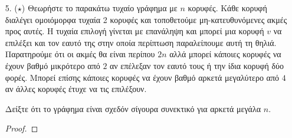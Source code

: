 \documentclass[a4paper, oneside, 11pt]{article}
\theoremstyle{definition}
\begin{document}
\begin{enumerate}
Λήμμα 2: Το ${x \choose 2} + {y\choose 2} + {n-x-y \choose 2}$ ελαχιστοποιείται για $x=y=\frac{n}{3}$.
\begin{proof}
Η παραπάνω παράσταση είναι ίση με $\frac{1}{2} (x^2 + y^2 + (n-x-y)^2 - (x+y+n-x-y)) \geq_{cauchy-schwarz} \frac{1}{2}(\frac{1}{3} n^2 - n)$. Η ισότητα πραγματοποιείται όταν $x=y=n-x-y$, δηλαδή $x=y=\frac{n}{3}$.
\end{proof}

\item[5. ($\star$)]
   Θεωρήστε το παρακάτω τυχαίο γράφημα με $n$ κορυφές. Κάθε κορυφή διαλέγει
   ομοιόμορφα τυχαία 2 κορυφές και τοποθετούμε μη-κατευθυνόμενες ακμές προς
   αυτές. Η τυχαία επιλογή γίνεται με επανάληψη και μπορεί μια κορυφή $v$ να
   επιλέξει και τον εαυτό της στην οποία περίπτωση παραλείπουμε αυτή τη θηλιά.
   Παρατηρούμε ότι οι ακμές θα είναι περίπου $2n$ αλλά μπορεί κάποιες κορυφές να
   έχουν βαθμό μικρότερο από $2$ αν επέλεξαν τον εαυτό τους ή την ίδια κορυφή
   δύο φορές. Μπορεί επίσης κάποιες κορυφές να έχουν βαθμό αρκετά μεγαλύτερο από
   $4$ αν άλλες κορυφές έτυχε να τις επιλέξουν.

   Δείξτε ότι το γράφημα είναι σχεδόν σίγουρα συνεκτικό για αρκετά μεγάλα $n$.

   \begin{proof}
   \end{proof}

\end{enumerate}
\end{document}
